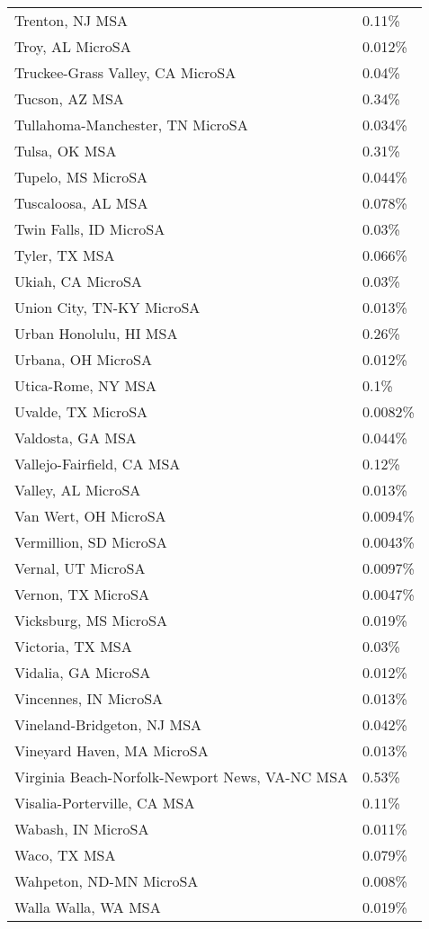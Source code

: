 \begin{longtable}[]{@{}ll@{}}
Trenton, NJ MSA & 0.11\% \\
Troy, AL MicroSA & 0.012\% \\
Truckee-Grass Valley, CA MicroSA & 0.04\% \\
Tucson, AZ MSA & 0.34\% \\
Tullahoma-Manchester, TN MicroSA & 0.034\% \\
Tulsa, OK MSA & 0.31\% \\
Tupelo, MS MicroSA & 0.044\% \\
Tuscaloosa, AL MSA & 0.078\% \\
Twin Falls, ID MicroSA & 0.03\% \\
Tyler, TX MSA & 0.066\% \\
Ukiah, CA MicroSA & 0.03\% \\
Union City, TN-KY MicroSA & 0.013\% \\
Urban Honolulu, HI MSA & 0.26\% \\
Urbana, OH MicroSA & 0.012\% \\
Utica-Rome, NY MSA & 0.1\% \\
Uvalde, TX MicroSA & 0.0082\% \\
Valdosta, GA MSA & 0.044\% \\
Vallejo-Fairfield, CA MSA & 0.12\% \\
Valley, AL MicroSA & 0.013\% \\
Van Wert, OH MicroSA & 0.0094\% \\
Vermillion, SD MicroSA & 0.0043\% \\
Vernal, UT MicroSA & 0.0097\% \\
Vernon, TX MicroSA & 0.0047\% \\
Vicksburg, MS MicroSA & 0.019\% \\
Victoria, TX MSA & 0.03\% \\
Vidalia, GA MicroSA & 0.012\% \\
Vincennes, IN MicroSA & 0.013\% \\
Vineland-Bridgeton, NJ MSA & 0.042\% \\
Vineyard Haven, MA MicroSA & 0.013\% \\
Virginia Beach-Norfolk-Newport News, VA-NC MSA & 0.53\% \\
Visalia-Porterville, CA MSA & 0.11\% \\
Wabash, IN MicroSA & 0.011\% \\
Waco, TX MSA & 0.079\% \\
Wahpeton, ND-MN MicroSA & 0.008\% \\
Walla Walla, WA MSA & 0.019\% \\

\end{longtable}
